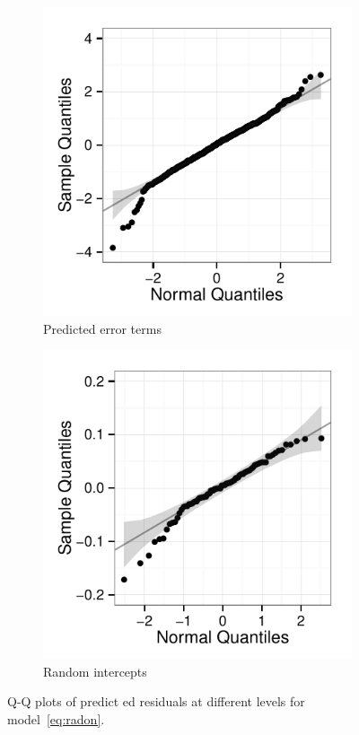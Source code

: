 \documentclass{article} %
\newcommand{\al}[1]{{\color{red} #1}}
\begin{document}
\begin{figure}[htb]
	\centering
	  \begin{subfigure}[b]{0.3\linewidth}
		\includegraphics[width=\linewidth]{raw-lev1-qq.pdf}
		\caption{Predicted error terms}
	  \end{subfigure}	
	  \begin{subfigure}[b]{0.3\linewidth}
	\includegraphics[width=\linewidth]{raw-intercept-qq.pdf}
		\caption{Random intercepts}
	  \end{subfigure}	
	\caption{\label{fig:qqplots1} Q-Q plots of predict\al{ed residuals} at different levels %
	for model~\eqref{eq:radon}.} %
\end{figure}
\end{document}
